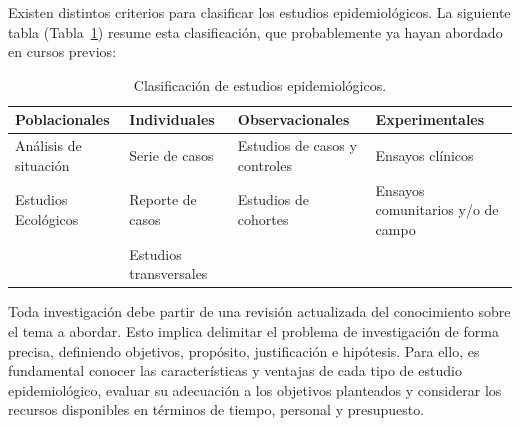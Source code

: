 \documentclass[
  spanish,
  a4paper,
]{scrbook}
\begin{document}
Existen distintos criterios para clasificar los estudios
epidemiológicos. La siguiente tabla (Tabla~\ref{tbl-tab1}) resume esta
clasificación, que probablemente ya hayan abordado en cursos previos:

{

\begin{longtable}[]{@{}
  >{\raggedright\arraybackslash}p{}
  >{\raggedright\arraybackslash}p{}
  >{\raggedright\arraybackslash}p{}
  >{\raggedright\arraybackslash}p{}@{}}

\caption{\label{tbl-tab1}Clasificación de estudios epidemiológicos.}

\tabularnewline

\toprule\noalign{}
\begin{minipage}[b]{\linewidth}\raggedright
Poblacionales
\end{minipage} & \begin{minipage}[b]{\linewidth}\raggedright
Individuales
\end{minipage} & \begin{minipage}[b]{\linewidth}\raggedright
Observacionales
\end{minipage} & \begin{minipage}[b]{\linewidth}\raggedright
Experimentales
\end{minipage} \\
\midrule\noalign{}
\endhead
\bottomrule\noalign{}
\endlastfoot
Análisis de situación & Serie de casos & Estudios de casos y controles &
Ensayos clínicos \\
Estudios Ecológicos & Reporte de casos & Estudios de cohortes & Ensayos
comunitarios y/o de campo \\
& Estudios transversales & & \\

\end{longtable}

}

Toda investigación debe partir de una revisión actualizada del
conocimiento sobre el tema a abordar. Esto implica delimitar el problema
de investigación de forma precisa, definiendo objetivos, propósito,
justificación e hipótesis. Para ello, es fundamental conocer las
características y ventajas de cada tipo de estudio epidemiológico,
evaluar su adecuación a los objetivos planteados y considerar los
recursos disponibles en términos de tiempo, personal y presupuesto.
\end{document}
